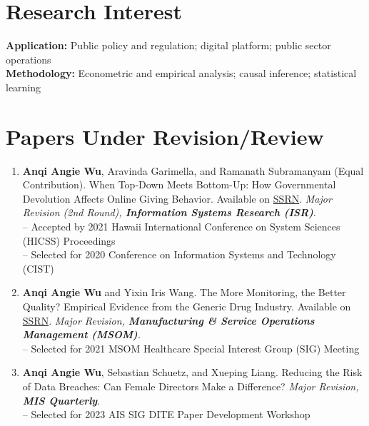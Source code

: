 \documentclass[margin,line]{resume}
\begin{document}
\begin{resume}

    \section{\mysidestyle Research Interest}
    \textbf{Application:} Public policy and regulation; digital platform; public sector operations\\
    \textbf{Methodology:} Econometric and empirical analysis; causal inference; statistical learning
    
    
 	  \section{\mysidestyle Papers Under Revision/Review} 
 	  \begin{enumerate}[topsep=0pt, leftmargin=*]
 	  
 	   	 \item \textbf{Anqi Angie Wu}, Aravinda Garimella, and Ramanath Subramanyam (Equal Contribution). When Top-Down Meets Bottom-Up: How Governmental Devolution Affects Online Giving Behavior. Available on \href{https://papers.ssrn.com/abstract=3779413}{{SSRN}}. \textit{Major Revision (2nd Round), \textbf{Information Systems Research (ISR)}}.\\	     [0.3em]
 	     -- Accepted by 2021 Hawaii International Conference on System Sciences (HICSS) Proceedings\\ 
 	     -- Selected for 2020 Conference on Information Systems and Technology (CIST) \\[-0.5em]
 	     
 	     \item \textbf{Anqi Angie Wu} and Yixin Iris Wang. The More Monitoring, the Better Quality? Empirical Evidence from the Generic Drug Industry. Available on \href{https://papers.ssrn.com/abstract=3596559}{{SSRN}}. \textit{Major Revision, \textbf{Manufacturing \& Service Operations Management (MSOM)}. }\\[0.3em]
 	     -- Selected for 2021 MSOM Healthcare Special Interest Group (SIG) Meeting\\[-0.5em]

       \item \textbf{Anqi Angie Wu}, Sebastian Schuetz, and Xueping Liang. Reducing the Risk of Data Breaches: Can Female Directors Make a Difference? \textit{Major Revision, \textbf{MIS Quarterly}}.\\[0.3em]
       -- Selected for 2023 AIS SIG DITE Paper Development Workshop\\[-0.5em]  
       

\end{enumerate}
\end{resume}
\end{document}
